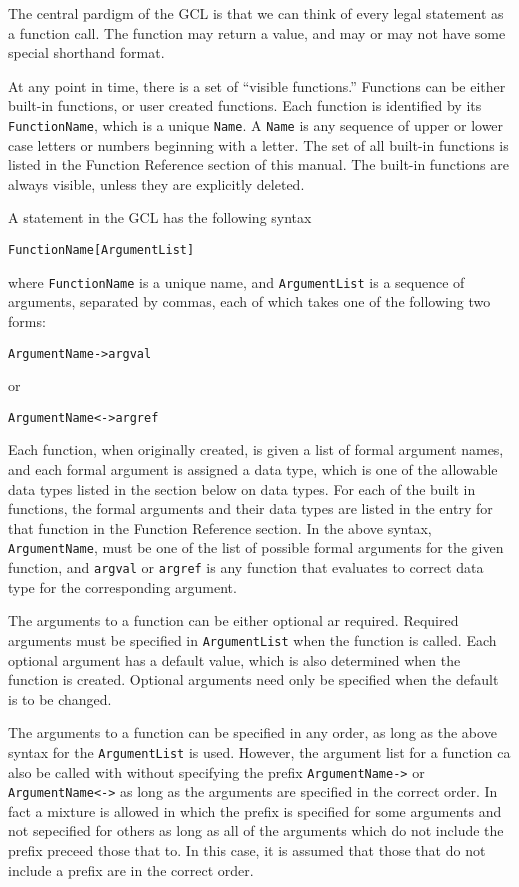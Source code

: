 The central pardigm of the GCL is that we can think of every legal
statement as a function call.  The function may return a value, and
may or may not have some special shorthand format.

At any point in time, there is a set of ``visible functions.''
Functions can be either built-in functions, or user created functions.
Each function is identified by its \verb+FunctionName+, which is a
unique \verb+Name+.  A \verb+Name+ is any sequence of upper or lower
case letters or numbers beginning with a letter.  The set of all
built-in functions is listed in the Function Reference section of this
manual.  The built-in functions are always visible, unless they are
explicitly deleted.

A statement in the GCL has the
following syntax
\begin{verbatim}
FunctionName[ArgumentList]
\end{verbatim}
where \verb+FunctionName+ is a unique name, and \verb+ArgumentList+ is
a sequence of arguments, separated by commas, each of which takes one
of the following two forms:
\begin{verbatim}
ArgumentName->argval
\end{verbatim}
or
\begin{verbatim}
ArgumentName<->argref
\end{verbatim}

Each function, when originally created, is given a list of formal
argument names, and each formal argument is assigned a data type,
which is one of the allowable data types listed in the section below
on data types.  For each of the built in functions, the formal
arguments and their data types are listed in the entry for that
function in the Function Reference section.  In the above syntax,
\verb+ArgumentName+, must be one of the list of possible formal
arguments for the given function, and \verb+argval+ or \verb+argref+
is any function that evaluates to correct data type for the
corresponding argument. 

The arguments to a function can be either optional ar required.
Required arguments must be specified in \verb+ArgumentList+ when the
function is called.  Each optional argument has a default value, which
is also determined when the function is created.  Optional arguments
need only be specified when the default is to be changed.

The arguments to a function can be specified in any order, as long as
the above syntax for the \verb+ArgumentList+ is used.  However, the
argument list for a function ca also be called with without specifying
the prefix \verb+ArgumentName->+ or \verb+ArgumentName<->+ as long as
the arguments are specified in the correct order.  In fact a mixture
is allowed in which the prefix is specified for some arguments and not
sepecified for others as long as all of the arguments which do not
include the prefix preceed those that to.  In this case, it is assumed
that those that do not include a prefix are in the correct order.  

